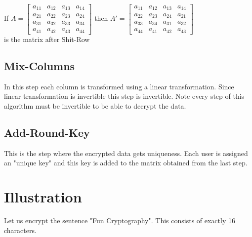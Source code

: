 \vspace{2mm}
If \(A=\begin{bmatrix}
    a_{11}&a_{12}&a_{13}&a_{14}\\
    a_{21}&a_{22}&a_{23}&a_{24}\\
    a_{31}&a_{32}&a_{33}&a_{34}\\
    a_{41}&a_{42}&a_{43}&a_{44}
    \end{bmatrix}\) then \(A'=\begin{bmatrix}
    a_{11}&a_{12}&a_{13}&a_{14}\\
    a_{22}&a_{23}&a_{24}&a_{21}\\
    a_{33}&a_{34}&a_{31}&a_{32}\\
    a_{44}&a_{41}&a_{42}&a_{43}
    \end{bmatrix}\) \vspace{2mm} \\ is the matrix after Shit-Row

\subsection{Mix-Columns}
In this step each column is transformed using a linear transformation. Since linear transformation is invertible this step is invertible. Note every step of this algorithm must be invertible to be able to decrypt the data.

\subsection{Add-Round-Key}
This is the step where the encrypted data gets uniqueness. Each user is assigned an "unique key" and this key is added to the matrix obtained from the last step.

\section{Illustration}
Let us encrypt the sentence "Fun Cryptography". This consists of exactly 16 characters.

